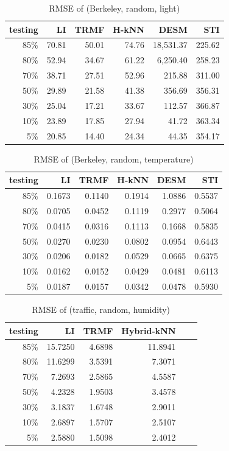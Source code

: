 \begin{table} [htbp]
\centering
\caption{RMSE of (Berkeley, random, light)}
\label{table:berkeley_random_light}
\begin{tabular}{ r | r r r r r}
	testing	&LI	&TRMF	&H-kNN	&DESM	&STI\\ \hline
	85\%	&70.81	&50.01	&74.76	&18,531.37	&225.62\\
	80\%	&52.94	&34.67	&61.22	&6,250.40	&258.23\\
	70\%	&38.71	&27.51	&52.96	&215.88	&311.00\\
	50\%	&29.89	&21.58	&41.38	&356.69	&356.31\\
	30\%	&25.04	&17.21	&33.67	&112.57	&366.87\\
	10\%	&23.89	&17.85	&27.94	&41.72	&363.34\\
	 5\%	&20.85	&14.40	&24.34	&44.35	&354.17\\
\end{tabular}
\end{table}

\begin{table}[htbp]
\centering
\caption{RMSE of (Berkeley, random, temperature)}
\label{table:berkeley_random_tem}
\begin{tabular}{ r | r r r r r}
	testing	&LI	&TRMF	&H-kNN	&DESM	&STI\\ \hline
	85\%	&0.1673	&0.1140	&0.1914	&1.0886	&0.5537\\
	80\%	&0.0705	&0.0452	&0.1119	&0.2977	&0.5064\\
	70\%	&0.0415	&0.0316	&0.1113	&0.1668	&0.5835\\
	50\%	&0.0270	&0.0230	&0.0802	&0.0954	&0.6443\\
	30\%	&0.0206	&0.0182	&0.0529	&0.0665	&0.6375\\
	10\%	&0.0162	&0.0152	&0.0429	&0.0481	&0.6113\\
	 5\%	&0.0187	&0.0157	&0.0342	&0.0478	&0.5930\\
\end{tabular}
\end{table}

\begin{table} [htbp]
\centering
\caption{RMSE of (traffic, random, humidity)}
\label{table:traffic_random_hum}
\begin{tabular}{ r | r r r r r}
	testing	&LI	&TRMF	&Hybrid-kNN \\ \hline
	85\%	&15.7250	&4.6898	&11.8941\\ 
	80\%	&11.6299	&3.5391	&7.3071\\
	70\%	& 7.2693	&2.5865	&4.5587\\
	50\%	& 4.2328	&1.9503	&3.4578\\
	30\%	& 3.1837	&1.6748	&2.9011\\
	10\%	& 2.6897	&1.5707	&2.5107\\
	 5\%	& 2.5880	&1.5098	&2.4012\\
\end{tabular}
\end{table}

